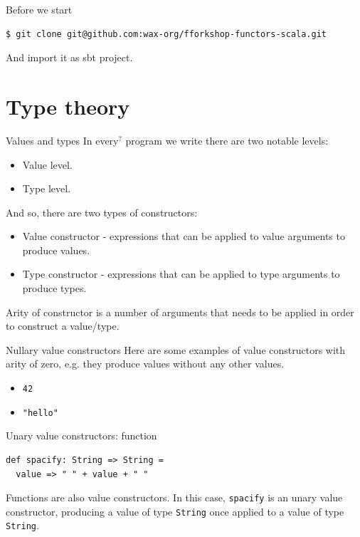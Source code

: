\documentclass[presentation,aspectratio=169,smaller]{beamer}
\begin{document}
\begin{frame}[label={sec:org111f399},fragile]{Before we start}
 \begin{verbatim}
$ git clone git@github.com:wax-org/fforkshop-functors-scala.git
\end{verbatim}

And import it as sbt project.
\end{frame}

\section{Type theory}
\label{sec:org65302f3}
\begin{frame}[label={sec:orgab801c2}]{Values and types}
In every\(^{?}\) program we write there are two notable levels:

\begin{itemize}
\item Value level.
\item Type level.
\end{itemize}

\pause

And so, there are two types of constructors:

\begin{itemize}
\item \alert{Value constructor} - expressions that can be applied to value arguments to
produce values.
\item \alert{Type constructor} - expressions that can be applied to type arguments to
produce types.
\end{itemize}

\pause

\alert{Arity} of constructor is a number of arguments that needs to be applied in
order to construct a value/type.
\end{frame}

\begin{frame}[label={sec:orgd46e774},fragile]{Nullary value constructors}
 Here are some examples of value constructors with arity of zero, e.g. they
produce values without any other values.

\begin{itemize}
\item \texttt{42}
\item \texttt{"hello"}
\end{itemize}
\end{frame}

\begin{frame}[label={sec:orga88ac42},fragile]{Unary value constructors: function}
 \begin{verbatim}
def spacify: String => String =
  value => " " + value + " "
\end{verbatim}

Functions are also value constructors. In this case, \texttt{spacify} is an unary value
constructor, producing a value of type \texttt{String} once applied to a value of type
\texttt{String}.
\end{frame}
\end{document}
